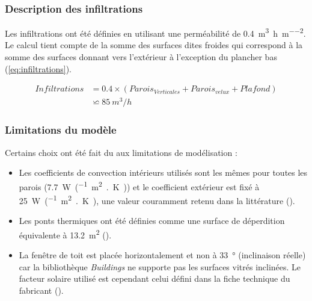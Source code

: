 \subsubsection{Description des infiltrations} %
\label{ssub:description_des_infiltrations}
Les infiltrations ont été définies en utilisant une perméabilité de
\SI{0.4}{m^{3}\per\hour\per\meter\squared}. Le calcul tient compte de la
somme des surfaces dites froides qui correspond à la somme des surfaces donnant
vers l’extérieur à l’exception du plancher bas (\eqref{eq:infiltrations}).

\begin{align}
    Infiltrations &= 0.4 \times (Parois_{Verticales} + Parois_{velux} + Plafond)\\
    &              \backsimeq 85~\si{m^{3}/h}
    \label{eq:infiltrations}
\end{align}


\subsubsection{Limitations du modèle} %
\label{ssub:limitations_du_modele}
Certains choix ont été fait du aux limitations de modélisation :
\begin{itemize}
    \item Les coefficients de convection intérieurs utilisés sont les mêmes pour toutes
          les parois (\SI{7.7}{\watt\per(\meter\squared{.}\kelvin)}) et le coefficient extérieur
          est fixé à \SI{25}{\watt\per(\meter\squared{.}\kelvin)}, une valeur couramment retenu
          dans la littérature ().
    \item Les ponts thermiques ont été définies comme une surface de déperdition
          équivalente à \SI{13.2}{\meter\squared} ().
    \item La fenêtre de toit est placée horizontalement et non à \SI{33}{\degree}
          (inclinaison réelle) car la bibliothèque \textit{Buildings} ne supporte pas les
          surfaces vitrés inclinées. Le facteur solaire utilisé est cependant celui défini
          dans la fiche technique du fabricant ().
\end{itemize}


